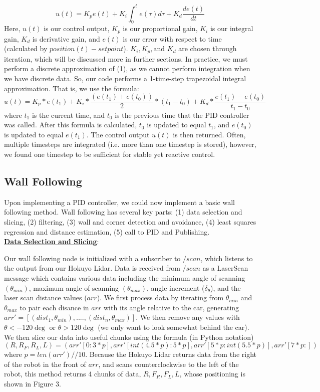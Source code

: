 \documentclass{article}
\begin{document}
\begin{equation}
    u(t)=K_pe(t)+K_i\int_0^te(\tau)d\tau + K_d\frac{de(t)}{dt}
\end{equation}
Here, $u(t)$ is our control output, $K_p$ is our proportional gain, $K_i$ is our integral gain, $K_d$ is derivative gain, and $e(t)$ is our error with respect to time (calculated by $position(t)-setpoint$). $K_i, K_p, \textrm{and } K_d$ are chosen through iteration, which will be discussed more in further sections. In practice, we must perform a discrete approximation of (1), as we cannot perform integration when we have discrete data. So, our code performs a 1-time-step trapezoidal integral approximation. That is, we use the formula:
\begin{equation}
    u(t) = K_p*e(t_{1})+K_i*\frac{(e(t_1)+e(t_0))}{2}*(t_1-t_0)+K_d*\frac{e(t_1)-e(t_0)}{t_1-t_0}
\end{equation}
where $t_1$ is the current time, and $t_0$ is the previous time that the PID controller was called. After this formula is calculated, $t_0$ is updated to equal $t_1$, and $e(t_0)$ is updated to equal $e(t_1)$. The control output $u(t)$ is then returned. Often, multiple timesteps are integrated (i.e. more than one timestep is stored), however, we found one timestep to be sufficient for stable yet reactive control.


\subsection{Wall Following}
Upon implementing a PID controller, we could now implement a basic wall following method. Wall following has several key parts: (1) data selection and slicing, (2) filtering, (3) wall and corner detection and avoidance, (4) least squares regression and distance estimation, (5) call to PID and Publishing.\\

\textbf{\underline{Data Selection and Slicing}}: 

Our wall following node is initialized with a subscriber to $/scan$, which listens to the output from our Hokuyo Lidar. Data is received from $/scan$ as a LaserScan message which contains various data including the minimum angle of scanning $(\theta_{min})$, maximum angle of scanning $(\theta_{max})$, angle increment ($\delta_{\theta}$), and the laser scan distance values ($arr$). We first process data by iterating from $\theta_{min}$ and $\theta_{max}$ to pair each disance in $arr$ with its angle relative to the car, generating $arr' = [(dist_1,\theta_{min}),....,(dist_n,\theta_{max})]$. We then remove any values with $\theta < -120\deg$ or $\theta > 120\deg$ (we only want to look somewhat behind the car). We then slice our data into useful chunks using the formula (in Python notation)
\begin{equation}
    ({R,R_F,R_L,L}) = (arr'[0:3*p],arr'[int(4.5*p):5*p],arr'[5*p:int(5.5*p)], arr'[7*p:])
\end{equation}
where $p=len(arr')//10$. Because the Hokuyo Lidar returns data from the right of the robot in the front of $arr$, and scans counterclockwise to the left of the robot, this method returns 4 chunks of data, $R,F_R,F_L,L$, whose positioning is shown in Figure 3. \\
\end{document}
